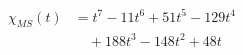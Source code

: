 \documentclass[a4paper]{article}
\begin{document}
\begin{equation*}
   \begin{split}
   \chi_{MS}(t) & = t^7 - 11t^6 + 51t^5 - 129t^4 \\
   & \quad + 188t^3 - 148t^2 + 48t \\
   \end{split}
  \end{equation*}
\end{document}

